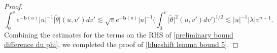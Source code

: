 \documentclass[10pt,a4paper]{amsart}
\begin{document}
\begin{proof}
    \[\int_0^ve^{-\mathbf{b}(u)}|u|^{-1}\big|\widetilde{\theta}\big|(u,v')dv'\lesssim\sqrt{v}e^{-\mathbf{b}(u)}|u|^{-1}\bigg(\int_0^v\big|\widetilde{\theta}\big|^2(u,v')dv'\bigg)^{1/2}\lesssim|u|^{-1}|\lambda|v^{n+1}.\]
    Combining the estimates for the terms on the RHS of \eqref{preliminary bound difference du phi}, we completed the proof of \eqref{blueshift lemma bound 5}.
\end{proof}
\end{document}

